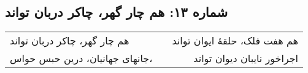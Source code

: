 \begin{center}
\section*{شماره ۱۳: هم چار گهر،‌ چاکر دربان تواند}
\label{sec:013}
\begin{longtable}{l p{0.5cm} r}
هم چار گهر،‌ چاکر دربان تواند
&&
هم هفت فلک، حلقهٔ ایوان تواند
\\
جانهای جهانیان، درین حبس حواس،
&&
اجراخور نایبان دیوان تواند
\\
\end{longtable}
\end{center}
